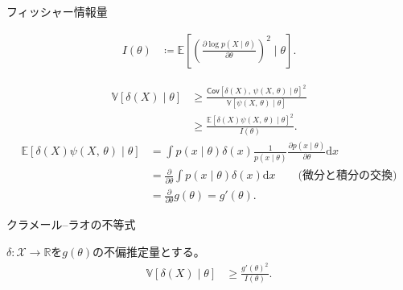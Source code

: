 \documentclass[lualatex,handout]{beamer}
\newcommand{\expt}[1]{\mathbb{E}\left[#1\right]}
\newcommand{\var}[1]{\mathbb{V}\left[#1\right]}
\newcommand{\cov}[1]{\mathsf{Cov}\left[#1\right]}
\theoremstyle{definition}
\begin{document}
\begin{frame}{フィッシャー情報量}
\small
\begin{definition}[フィッシャー情報量]
\vspace{-1em}
\begin{align*}
I(\theta) &\coloneq \expt{\left(\frac{\partial \log p(X\mid\theta)}{\partial\theta}\right)^2\mid\theta}.
\end{align*}
\end{definition}
\begin{align*}
\var{\delta(X)\mid\theta}&\ge\frac{\cov{\delta(X),\,\psi(X,\,\theta)\mid\theta}^2}{\var{\psi(X,\,\theta)\mid\theta}}\\
&\ge\frac{\expt{\delta(X)\psi(X,\,\theta)\mid\theta}^2}{I(\theta)}.
\end{align*}
\begin{align*}
\expt{\delta(X)\psi(X,\,\theta)\mid\theta}&=
\int p(x\mid\theta) \delta(x)\frac1{p(x\mid\theta)}\frac{\partial p(x\mid\theta)}{\partial\theta}\mathrm{d}x\\
&=
\frac{\partial}{\partial\theta}\int p(x\mid\theta) \delta(x)\mathrm{d}x\qquad\text{(微分と積分の交換)}\\
&=
\frac{\partial}{\partial\theta}g(\theta)=g'(\theta).
\end{align*}
\end{frame}

\begin{frame}{クラメール--ラオの不等式}
\begin{theorem}
$\delta\colon\mathcal{X}\to\mathbb{R}$を$g(\theta)$の不偏推定量とする。
\begin{align*}
\var{\delta(X)\mid\theta} &\ge \frac{g'(\theta)^2}{I(\theta)}.
\end{align*}
\end{theorem}
\end{frame}
\end{document}
